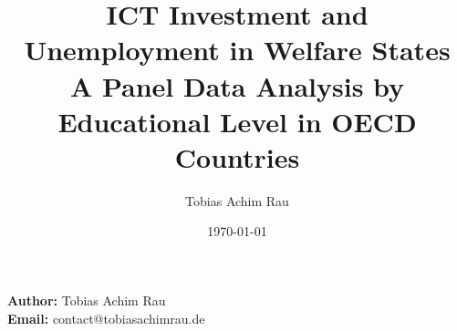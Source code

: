 \documentclass[a4paper, 12pt]{article}
\title{ICT Investment and Unemployment in Welfare States \\
\large A Panel Data Analysis by Educational Level in OECD Countries}
\author{Tobias Achim Rau}
\date{\today}
\begin{document}
\maketitle
\thispagestyle{empty}
\vspace{10cm}

\begin{center}
  \textbf{Author:} Tobias Achim Rau \\
  \textbf{Email:} contact@tobiasachimrau.de \\
\end{center}

\newpage

\newpage
\thispagestyle{empty}
\null
\newpage

\setcounter{page}{1}

\tableofcontents

\newpage

\setcounter{page}{1}









\renewcommand{\bibfont}{\small}
\printbibliography

\newpage

\appendix

\end{document}
